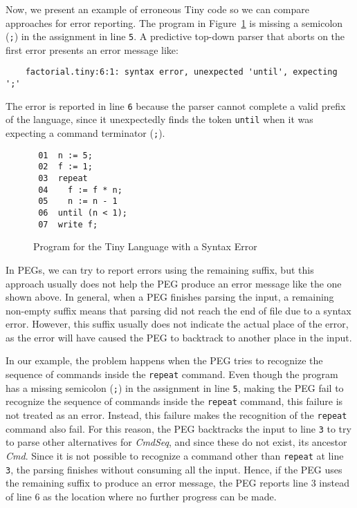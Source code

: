 \documentclass[3p,12pt,singlecolumn]{elsarticle}
\begin{document}
Now, we present an example of erroneous Tiny code so we can compare
approaches for error reporting.
The program in Figure~\ref{fig:tinyerror} is missing a semicolon
(\texttt{;}) in the assignment in line \texttt{5}.
A predictive top-down parser that aborts on the first error presents
an error message like:

\begin{verbatim}
    factorial.tiny:6:1: syntax error, unexpected 'until', expecting ';'
\end{verbatim}

The error is reported in line \texttt{6} because the parser cannot
complete a valid prefix of the language, since it unexpectedly
finds the token \texttt{until} when it was expecting a command
terminator (\texttt{;}).

\begin{figure}[t]
\begin{verbatim}
 01  n := 5;
 02  f := 1;
 03  repeat
 04    f := f * n;
 05    n := n - 1
 06  until (n < 1);
 07  write f;
\end{verbatim}
\caption{Program for the Tiny Language with a Syntax Error}
\label{fig:tinyerror}
\end{figure}

In PEGs, we can try to report errors using the remaining suffix, but
this approach usually does not help the PEG produce an error
message like the one shown above.
In general, when a PEG finishes parsing the input, a remaining non-empty suffix means that parsing did not reach the end of file due to a syntax error. However, this suffix usually does not indicate the
actual place of the error, as the error will have caused the PEG
to backtrack to another place in the input.

In our example, the problem happens when the PEG tries to recognize
the sequence of commands inside the \texttt{repeat} command.
Even though the program has a missing semicolon (\texttt{;}) in the
assignment in line \texttt{5}, making the PEG fail to recognize
the sequence of commands inside the \texttt{repeat} command, this
failure is not treated as an error.
Instead, this failure makes the recognition of the \texttt{repeat}
command also fail.
For this reason, the PEG backtracks the input to line \texttt{3}
to try to parse other alternatives for {\em CmdSeq},
and since these do not exist, its ancestor {\em Cmd}.
Since it is not possible to recognize a command other than
\texttt{repeat} at line \texttt{3},
the parsing finishes without consuming all the input.
Hence, if the PEG uses the remaining suffix to produce an error
message, the PEG reports line 3 instead of line 6 as the location 
where no further progress can be made.
\end{document}
